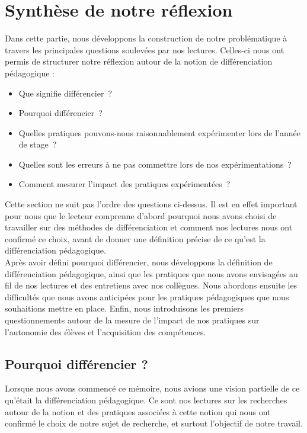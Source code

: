 \section{Synthèse de notre réflexion}
Dans cette partie, nous développons la construction de notre problématique à travers les principales questions soulevées par nos lectures. Celles-ci nous ont permis de structurer notre réflexion autour de la notion de différenciation pédagogique :

\begin{itemize}
  \item Que signifie différencier ?
  \item Pourquoi différencier ?
  \item Quelles pratiques pouvons-nous raisonnablement expérimenter lors de l'année de stage ?
  \item Quelles sont les erreurs à ne pas commettre lors de nos expérimentations ?
  \item Comment mesurer l'impact des pratiques expérimentées ?
\end{itemize}

Cette section ne suit pas l'ordre des questions ci-dessus. Il est en effet important pour nous que le lecteur comprenne d'abord pourquoi nous avons choisi de travailler sur des méthodes de différenciation et comment nos lectures nous ont confirmé ce choix, avant de donner une définition précise de ce qu'est la différenciation pédagogique.\\
Après avoir défini pourquoi différencier, nous développons la définition de différenciation pédagogique, ainsi que les pratiques que nous avons envisagées au fil de nos lectures et des entretiens avec nos collègues. Nous abordons ensuite les difficultés que nous avons anticipées pour les pratiques pédagogiques que nous souhaitions mettre en place. Enfin, nous introduisons les premiers questionnements autour de la mesure de l'impact de nos pratiques sur l'autonomie des élèves et l'acquisition des compétences.\\

\subsection{Pourquoi différencier ?}


Lorsque nous avons commencé ce mémoire, nous avions une vision partielle de ce qu'était la différenciation pédagogique. Ce sont nos lectures sur les recherches autour de la notion et des pratiques associées à cette notion qui nous ont confirmé le choix de notre sujet de recherche, et surtout l'objectif de notre travail.
